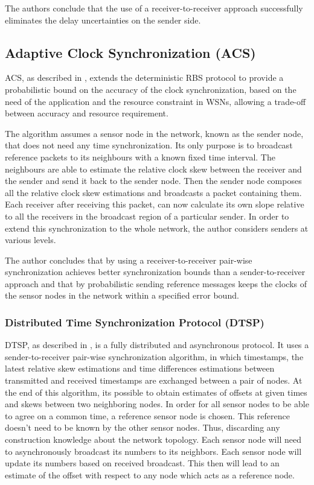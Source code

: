 The authors conclude that the use of a receiver-to-receiver approach successfully eliminates the delay uncertainties on the sender side.

\subsection{Adaptive Clock Synchronization (ACS)}
\ac{ACS}, as described in \cite{conf/ipsn/PalChaudhuriSJ04}, extends the deterministic RBS protocol to provide a probabilistic bound on the accuracy of the clock synchronization, based on the need of the application and the resource constraint in WSNs, allowing a trade-off between accuracy and resource requirement.

The algorithm assumes a sensor node in the network, known as the sender node, that does not need any time synchronization. Its only purpose is to broadcast reference packets to its neighbours with a known fixed time interval. The neighbours are able to estimate the relative clock skew between the receiver and the sender and send it back to the sender node. Then the sender node composes all the relative clock skew estimations and broadcasts a packet containing them. Each receiver after receiving this packet, can now calculate its own slope relative to all the receivers in the broadcast region of a
particular sender. In order to extend this synchronization to the whole network, the author considers senders at various levels.

The author concludes that by using a receiver-to-receiver pair-wise synchronization achieves better synchronization bounds than a sender-to-receiver approach and that by probabilistic sending reference messages keeps the clocks of the sensor nodes in the network within a specified error bound.

\subsubsection{Distributed Time Synchronization Protocol (DTSP)}
\ac{DTSP}, as described in \cite{solis06}, is a fully distributed and asynchronous protocol. It uses a sender-to-receiver pair-wise synchronization algorithm, in which timestamps, the latest relative skew
estimations and time differences estimations between transmitted and received timestamps are exchanged between a pair of nodes. At the end of this algorithm, its possible to obtain estimates of offsets at given times and skews between two neighboring nodes. In order for all sensor nodes to be able to agree on a common time, a reference sensor node is chosen. This reference doesn't need to be known by the other sensor nodes. Thus, discarding any construction knowledge about the network topology. Each sensor node will need to asynchronously broadcast its numbers to its neighbors. Each sensor node will update its numbers based on received broadcast. This then will lead to an estimate of the offset with respect to any node which acts as a reference node.


